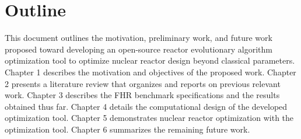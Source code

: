\section{Outline}
This document outlines the motivation, preliminary work, and future work proposed 
toward developing an open-source reactor evolutionary algorithm optimization tool 
to optimize nuclear reactor design beyond classical parameters. 
Chapter 1 describes the motivation and objectives of the proposed work. 
Chapter 2 presents a literature review that organizes and reports on previous 
relevant work. 
Chapter 3 describes the \gls{FHR} benchmark specifications and the results 
obtained thus far. 
Chapter 4 details the computational design of the developed optimization 
tool. 
Chapter 5 demonstrates nuclear reactor optimization with the optimization 
tool.  
Chapter 6 summarizes the remaining future work. 
